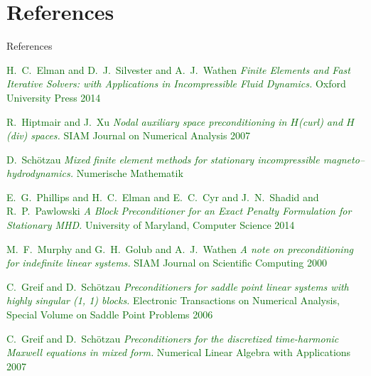 \documentclass[12pt]{beamer}
\newcommand{\gr}[1]{\textcolor{darkgreen} {#1}}
\begin{document}
\section{References}
\begin{frame}{References}

\begin{thebibliography}{9}
\tiny
{}
\gr{H.~C.~Elman and D.~J.~Silvester and A.~J.~Wathen}
\newblock \gr{\it Finite Elements and Fast Iterative Solvers: with Applications in Incompressible Fluid Dynamics.}
\newblock \gr{Oxford University Press 2014}



\gr{R.~Hiptmair and J.~Xu}
\newblock \gr{\it Nodal auxiliary space preconditioning in {$H$(curl) and $H$(div)} spaces.}
\newblock \gr{SIAM Journal on Numerical Analysis 2007}

\gr{D.~Sch{\"o}tzau}
\newblock \gr{\it Mixed finite element methods for stationary incompressible magneto--hydrodynamics.}
\newblock \gr{Numerische Mathematik}

\gr{E.~G.~Phillips and H.~C.~Elman and E.~C.~Cyr and J.~N.~Shadid and R.~P.~Pawlowski}
\newblock \gr{\it A Block Preconditioner for an Exact Penalty Formulation for Stationary {MHD}.}
\newblock \gr{University of Maryland, Computer Science 2014}

\gr{M.~F.~Murphy and G.~H.~Golub and A.~J.~Wathen}
\newblock \gr{\it A note on preconditioning for indefinite linear systems.}
\newblock \gr{SIAM Journal on Scientific Computing 2000}

\gr{C.~Greif and D.~Sch{\"o}tzau}
\newblock \gr{\it Preconditioners for saddle point linear systems with highly singular (1, 1) blocks.}
\newblock \gr{Electronic Transactions on Numerical Analysis, Special Volume on Saddle Point Problems 2006}

\gr{C.~Greif and D.~Sch{\"o}tzau}
\newblock \gr{\it Preconditioners for the discretized time-harmonic {M}axwell equations in mixed form.}
\newblock \gr{Numerical Linear Algebra with Applications 2007}





\end{thebibliography}
\end{frame}
\end{document}
